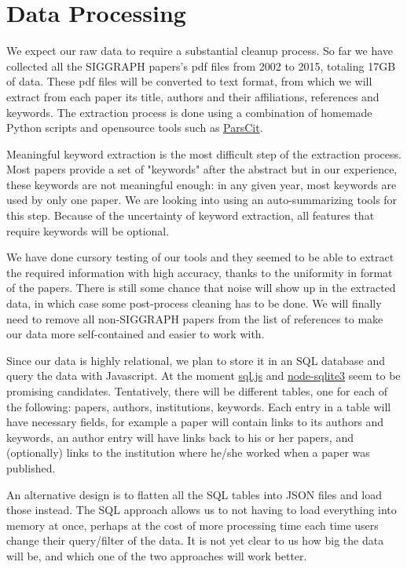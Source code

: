 \documentclass[dvips,12pt]{article}
\begin{document}
\section{Data Processing}
We expect our raw data to require a substantial cleanup process. So far we have collected all the SIGGRAPH papers's pdf files from 2002 to 2015, totaling 17GB of data. These pdf files will be converted to text format, from which we will extract from each paper its title, authors and their affiliations, references and keywords. The extraction process is done using a combination of homemade Python scripts and opensource tools such as \href{http://aye.comp.nus.edu.sg/parsCit/}{ParsCit}.

Meaningful keyword extraction is the most difficult step of the extraction process. Most papers provide a set of "keywords" after the abstract but in our experience, these keywords are not meaningful enough: in any given year, most keywords are used by only one paper. We are looking into using an auto-summarizing tools for this step. Because of the uncertainty of keyword extraction, all features that require keywords will be optional.

We have done cursory testing of our tools and they seemed to be able to extract the required information with high accuracy, thanks to the uniformity in format of the papers. There is still some chance that noise will show up in the extracted data, in which case some post-process cleaning has to be done. We will finally need to remove all non-SIGGRAPH papers from the list of references to make our data more self-contained and easier to work with.

Since our data is highly relational, we plan to store it in an SQL database and query the data with Javascript. At the moment \href{https://github.com/kripken/sql.js/}{sql.js} and \href{https://github.com/mapbox/node-sqlite3}{node-sqlite3} seem to be promising candidates. Tentatively, there will be different tables, one for each of the following: papers, authors, institutions, keywords. Each entry in a table will have necessary fields, for example a paper will contain links to its authors and keywords, an author entry will have links back to his or her papers, and (optionally) links to the institution where he/she worked when a paper was published.

An alternative design is to flatten all the SQL tables into JSON files and load those instead. The SQL approach allows us to not having to load everything into memory at once, perhaps at the cost of more processing time each time users change their query/filter of the data. It is not yet clear to us how big the data will be, and which one of the two approaches will work better.
\end{document}
